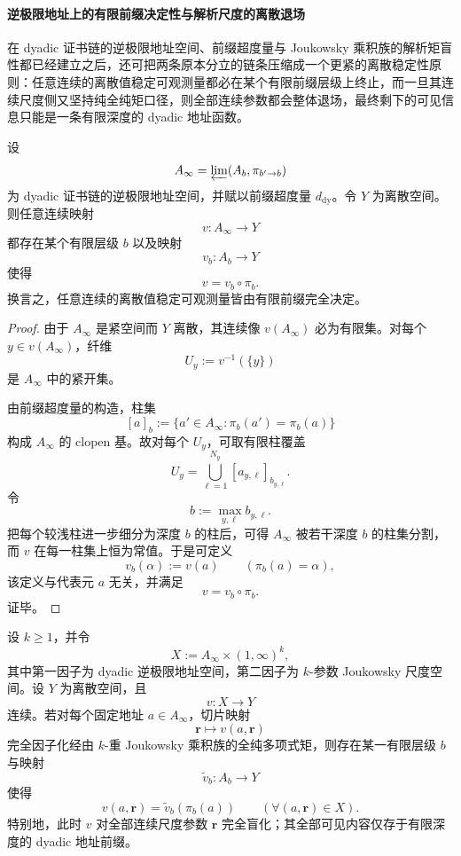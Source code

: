 \paragraph{逆极限地址上的有限前缀决定性与解析尺度的离散退场}
在 dyadic 证书链的逆极限地址空间、前缀超度量与 Joukowsky 乘积族的解析矩盲性都已经建立之后，还可把两条原本分立的链条压缩成一个更紧的离散稳定性原则：任意连续的离散值稳定可观测量都必在某个有限前缀层级上终止，而一旦其连续尺度侧又坚持纯全纯矩口径，则全部连续参数都会整体退场，最终剩下的可见信息只能是一条有限深度的 dyadic 地址函数。

\begin{theorem}[逆极限地址上的有限前缀决定性]\label{thm:conclusion-inverse-limit-address-finite-prefix-determinacy}
设
\[
A_\infty=\varprojlim (A_b,\pi_{b'\to b})
\]
为 dyadic 证书链的逆极限地址空间，并赋以前缀超度量 \(d_{\mathrm{dy}}\)。令 \(Y\) 为离散空间。则任意连续映射
\[
v:A_\infty\longrightarrow Y
\]
都存在某个有限层级 \(b\) 以及映射
\[
v_b:A_b\longrightarrow Y
\]
使得
\[
v=v_b\circ \pi_b.
\]
换言之，任意连续的离散值稳定可观测量皆由有限前缀完全决定。
\end{theorem}

\begin{proof}
由于 \(A_\infty\) 是紧空间而 \(Y\) 离散，其连续像 \(v(A_\infty)\) 必为有限集。对每个 \(y\in v(A_\infty)\)，纤维
\[
U_y:=v^{-1}(\{y\})
\]
是 \(A_\infty\) 中的紧开集。

由前缀超度量的构造，柱集
\[
[a]_b:=\{a'\in A_\infty:\pi_b(a')=\pi_b(a)\}
\]
构成 \(A_\infty\) 的 clopen 基。故对每个 \(U_y\)，可取有限柱覆盖
\[
U_y=\bigcup_{\ell=1}^{N_y}[a_{y,\ell}]_{b_{y,\ell}}.
\]
令
\[
b:=\max_{y,\ell} b_{y,\ell}.
\]
把每个较浅柱进一步细分为深度 \(b\) 的柱后，可得 \(A_\infty\) 被若干深度 \(b\) 的柱集分割，而 \(v\) 在每一柱集上恒为常值。于是可定义
\[
v_b(\alpha):=v(a)
\qquad
(\pi_b(a)=\alpha),
\]
该定义与代表元 \(a\) 无关，并满足
\[
v=v_b\circ \pi_b.
\]
证毕。
\end{proof}

\begin{corollary}\label{cor:conclusion-address-analytic-separation-collapse}
设 \(k\ge 1\)，并令
\[
X:=A_\infty\times (1,\infty)^k,
\]
其中第一因子为 dyadic 逆极限地址空间，第二因子为 \(k\)-参数 Joukowsky 尺度空间。设 \(Y\) 为离散空间，且
\[
v:X\longrightarrow Y
\]
连续。若对每个固定地址 \(a\in A_\infty\)，切片映射
\[
\mathbf r\longmapsto v(a,\mathbf r)
\]
完全因子化经由 \(k\)-重 Joukowsky 乘积族的全纯多项式矩，则存在某一有限层级 \(b\) 与映射
\[
\widetilde v_b:A_b\longrightarrow Y
\]
使得
\[
v(a,\mathbf r)=\widetilde v_b(\pi_b(a))
\qquad
(\forall (a,\mathbf r)\in X).
\]
特别地，此时 \(v\) 对全部连续尺度参数 \(\mathbf r\) 完全盲化；其全部可见内容仅存于有限深度的 dyadic 地址前缀。
\end{corollary}

